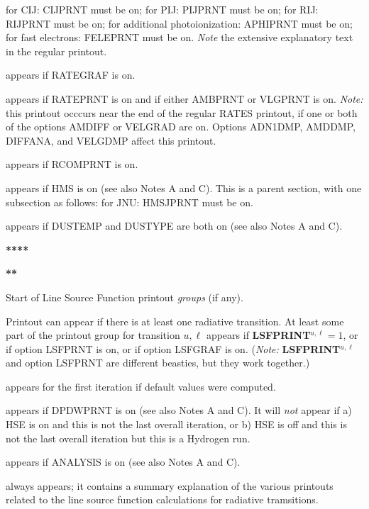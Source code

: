 \bull for CIJ: CIJPRNT must be on;
\bull for PIJ: PIJPRNT must be on;
\bull for RIJ: RIJPRNT must be on;
\bull for additional photoionization: APHIPRNT must be on;
\bull for fast electrons: FELEPRNT must be on. \np
{\it Note} the extensive explanatory text in the regular printout.
\blankline
{} \par
appears if RATEGRAF is on.
\ej
{} \par
appears if RATEPRNT is on and if either AMBPRNT or VLGPRNT is on. \np
{\it Note:} this printout occcurs near the end of the regular RATES printout,
if one or both of the options AMDIFF or VELGRAD are on. Options ADN1DMP,
AMDDMP, DIFFANA, and VELGDMP affect this printout.
\blankline
{} \par
appears if RCOMPRNT is on.
\blankline
{} \par
appears if HMS is on (see also Notes A and C). This is a parent
section, with one subsection as follows:
\bull for JNU: HMSJPRNT must be on.
\blankline
{} \par
appears if DUSTEMP and DUSTYPE are both on (see also Notes
A and C).
\ej
\centerline{\bf*****}
\centerline{\bf***}
\centerline{\bf*}
\blankline
\centerline{Start of Line Source Function printout
{\it groups} (if any).}
\blankline
Printout can appear if there is at least one radiative transition.
At least some part of the printout group for transition
$u,\ell$ appears if {\bf LSFPRINT}$^{u,\ell} = 1$, or if option
LSFPRNT is on, or if option LSFGRAF is on.
({\it Note:} {\bf LSFPRINT}$^{u,\ell}$ and option LSFPRNT are different
beasties, but they work together.)
\blankline
{} \par
appears for the first iteration if default values were computed.
\blankline
{} \par
appears if DPDWPRNT is on (see also Notes A and C).
It will {\it not} appear
if a) HSE is on and this is not the last overall iteration, or
b) HSE is off and this is not the last overall iteration but
this is a Hydrogen run.
\blankline
{} \par
appears if ANALYSIS is on (see also Notes A and C).
\blankline
{} \par
always appears; it contains a summary explanation of the various
printouts related to the line source function calculations for
radiative tramsitions.
\blankline
{} \par
